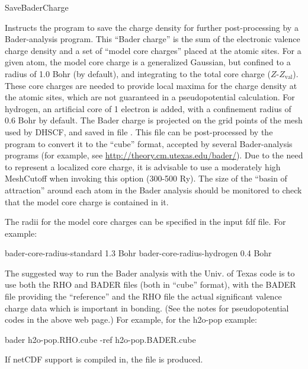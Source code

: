 \begin{fdflogicalF}{SaveBaderCharge}

  Instructs the program to save the charge density for further
  post-processing by a Bader-analysis program.  This ``Bader
  charge'' is the sum of the electronic valence charge density and a
  set of ``model core charges'' placed at the atomic sites. For a
  given atom, the model core charge is a generalized Gaussian, but
  confined to a radius of 1.0 Bohr (by default), and integrating to
  the total core charge ($Z$-$Z_{\mathrm{val}}$). These core charges are
  needed to provide local maxima for the charge density at the atomic
  sites, which are not guaranteed in a pseudopotential calculation.
  For hydrogen, an artificial core of 1 electron is added,
  with a confinement radius of 0.6 Bohr by default. The Bader
  charge is projected on the grid points of the mesh used by DHSCF,
  and saved in file . This file can be
  post-processed by the program  to convert it to
  the ``cube'' format, accepted by several Bader-analysis programs
  (for example, see \url{http://theory.cm.utexas.edu/bader/}).  Due to
  the need to represent a localized core charge, it is advisable to
  use a moderately high MeshCutoff when invoking this option (300-500
  Ry). The size of the ``basin of attraction'' around each atom in
  the Bader analysis should be monitored to check that the model core
  charge is contained in it.

  The radii for the model core charges can be specified in the input
  fdf file. For example:

    \begin{fdfexample}
       bader-core-radius-standard  1.3 Bohr
       bader-core-radius-hydrogen  0.4 Bohr
    \end{fdfexample}
  
  The suggested way to run the Bader analysis with the Univ. of
  Texas code is to use both the RHO and BADER files (both in
  ``cube'' format), with the BADER file providing the ``reference''
  and the RHO file the actual significant valence charge data which
  is important in bonding. (See the notes for pseudopotential codes
  in the above web page.) For example, for the h2o-pop example:

  \begin{shellexample}
    bader h2o-pop.RHO.cube -ref h2o-pop.BADER.cube
  \end{shellexample}

  If netCDF support is compiled in, the file 
  is produced.

\end{fdflogicalF}


